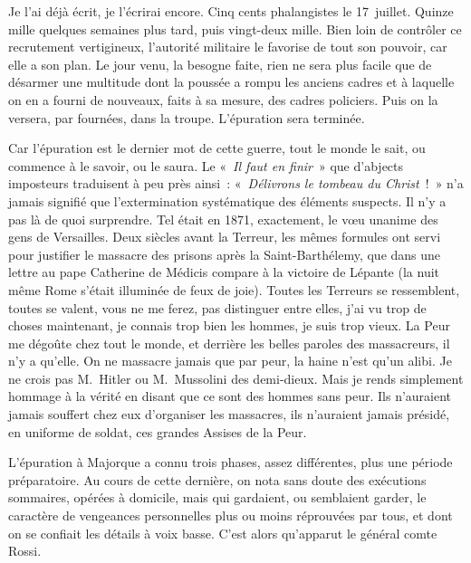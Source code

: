 \documentclass[french,twoside]{book} %
\begin{document}
Je l’ai déjà écrit, je l’écrirai encore. Cinq cents phalangistes le 17 juillet. Quinze mille quelques semaines plus tard, puis vingt-deux mille. Bien loin de contrôler ce recrutement vertigineux, l’autorité militaire le favorise de tout son pouvoir, car elle a son plan. Le jour venu, la besogne faite, rien ne sera plus facile que de désarmer une multitude dont la poussée a rompu les anciens cadres et à laquelle on en a fourni de nouveaux, faits à sa mesure, des cadres policiers. Puis on la versera, par fournées, dans la troupe. L’épuration sera terminée.\par
Car l’épuration est le dernier mot de cette guerre, tout le monde le sait, ou commence à le savoir, ou le saura. Le « \emph{Il faut en finir} » que d’abjects imposteurs traduisent à peu près ainsi : « \emph{Délivrons le tombeau du Christ} ! » n’a jamais signifié que l’extermination systématique des éléments suspects. Il n’y a pas là de quoi surprendre. Tel était en 1871, exactement, le vœu unanime des gens de Versailles. Deux siècles avant la Terreur, les mêmes formules ont servi pour justifier le massacre des prisons après la Saint-Barthélemy, que dans une lettre au pape Catherine de Médicis compare à la victoire de Lépante (la nuit même Rome s’était illuminée de feux de joie). Toutes les Terreurs se ressemblent, toutes se valent, vous ne me ferez, pas distinguer entre elles, j’ai vu trop de choses maintenant, je connais trop bien les hommes, je suis trop vieux. La Peur me dégoûte chez tout le monde, et derrière les belles paroles des massacreurs, il n’y a qu’elle. On ne massacre jamais que par peur, la haine n’est qu’un alibi. Je ne crois pas M. Hitler ou M. Mussolini des demi-dieux. Mais je rends simplement hommage à la vérité en disant que ce sont des hommes sans peur. Ils n’auraient jamais souffert chez eux d’organiser les massacres, ils n’auraient jamais présidé, en uniforme de soldat, ces grandes Assises de la Peur.\par
L’épuration à Majorque a connu trois phases, assez différentes, plus une période préparatoire. Au cours de cette dernière, on nota sans doute des exécutions sommaires, opérées à domicile, mais qui gardaient, ou semblaient garder, le caractère de vengeances personnelles plus ou moins réprouvées par tous, et dont on se confiait les détails à voix basse. C’est alors qu’apparut le général comte Rossi.\par
\end{document}
